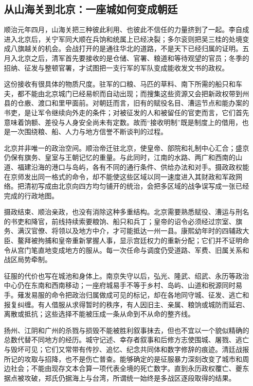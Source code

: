 \subsection{从山海关到北京：一座城如何变成朝廷}

顺治元年四月，山海关把三种彼此利用、也彼此不信任的力量挤到了一起。李自成进入北京后，关宁军同大顺在兵饷和统属上已经决裂；多尔衮则把吴三桂的处境变成八旗越关的机会。会战打开的是通往华北的道路，不是天下已经归属的证明。五月入北京之后，清军首先要接收的是仓储、官署、粮道和等待观望的官员；冬季的招纳、征发与整顿官署，才试图把一支行军的军队变成能收发文书的政权。

这份接收有很具体的物质尺度。驻军的口粮、马匹的草料、南下所需的船只和车夫，都不能由北京城门已经易帜而自动出现；而搜集这些资源又会把新政权带到州县的仓廒、渡口和里甲面前。对朝廷而言，旧有的赋役名目、漕运节点和能办案的书吏，是让军令继续向外走的条件；对被征发的人和被留任的官吏而言，它们首先意味着饷额、差役与人身安全尚未有定数。故而“接收明制”既是制度上的借用，也是一次围绕粮、船、人力与地方信誉不断谈判的过程。

北京并非唯一的政治空间。顺治帝迁驻北京，使皇帝、部院和礼制中心汇合；盛京仍保有旗务、皇室与王朝记忆的重量。与此同时，江南的水路、两广和西南的山道、福建沿海的港口与岛屿，各有不同的通行条件、供给办法和对手。摄政政权能在京师发出同一格式的命令，却不能使这些区域以同一速度进入其财政和军政网络。把清初写成由北京向四方均匀铺开的统治，会把多区域的战争误写成一张已经完成的行政地图。

摄政结束、顺治亲政，也没有消除这种多重结构。北京需要熟悉赋役、漕运与刑名的书吏和降官，前线持续索要粮饷、船只和兵丁；皇帝的诏令必须经过宗室、旗务、满汉官僚、将领以及地方中介，才可能抵达一州一县。康熙幼年时的四辅政大臣、鳌拜被拘捕和皇帝重新掌握人事，显示宫廷权力的重新分配；它们并不证明命令从宫门笔直地变成地方的服从。每一次任命与调度仍受道路、军费、旧属关系和战区局势牵制。

征服的代价也写在城池和身体上。南京失守以后，弘光、隆武、绍武、永历等政治中心仍在东南和西南移动；一座府城易手不等于乡村、岛屿、山道和税源同时易手。薙发易服的命令把政治归属做成可见的标记，却在各地同守城、征发、逃亡和报复纠缠。有人借服从求得暂时的秩序，有人因旧主、亲属、粮饷或城防而延宕、离散或抵抗；这些选择不能被压成一条从命到不从命的整齐线。

扬州、江阴和广州的杀戮与损毁不能被胜利叙事抹去，但也不宜以一个貌似精确的总数代替不同地方的经历。城守记述、幸存者叙事和后修方志使围城、屠戮、逃亡与毁坏可见；它们又常带有传抄、追忆、纪念共同体和数字修辞的痕迹。清廷战报所记的攻取与招降，也不是伤亡普查。能够确定的是征服暴力深刻改变了城市和周边社会；不能由现存文本合算一项代表全境的死亡数字。直到永历政权覆亡、夔东据点被攻破，郑氏仍据海上与台湾，所谓统一始终是多战区逐段取得的结果。

